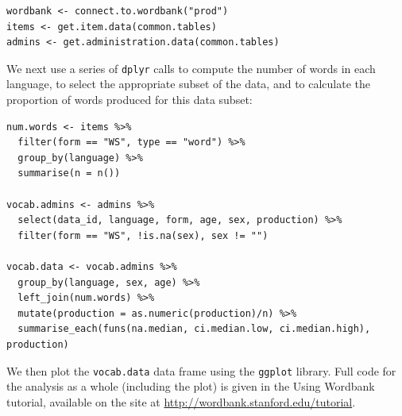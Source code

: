 \documentclass[doc,noapacite]{apa2}
\newcommand{\comment}[1]{\marginpar[]{\small \textcolor{blue}{#1}}}
\begin{document}
\begin{lstlisting}
wordbank <- connect.to.wordbank("prod")
items <- get.item.data(common.tables)
admins <- get.administration.data(common.tables)
\end{lstlisting}

\noindent We next use a series of \texttt{dplyr} calls to compute the number of words in each language, to select the appropriate subset of the data, and to calculate the proportion of words produced for this data subset:

\begin{lstlisting}
num.words <- items %>%
  filter(form == "WS", type == "word") %>%
  group_by(language) %>%
  summarise(n = n())

vocab.admins <- admins %>%
  select(data_id, language, form, age, sex, production) %>%
  filter(form == "WS", !is.na(sex), sex != "")

vocab.data <- vocab.admins %>%
  group_by(language, sex, age) %>%
  left_join(num.words) %>%
  mutate(production = as.numeric(production)/n) %>%
  summarise_each(funs(na.median, ci.median.low, ci.median.high), production)
\end{lstlisting}

\noindent We then plot the \texttt{vocab.data} data frame using the \texttt{ggplot} library. Full code for the analysis as a whole (including the plot) is given in the Using Wordbank tutorial, available on the site at \url{http://wordbank.stanford.edu/tutorial}. \comment{Update if package works differently.}
\end{document}
